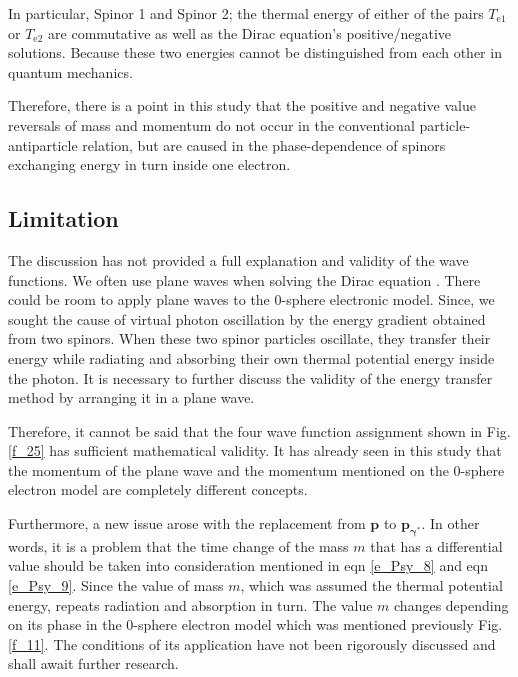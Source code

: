 \documentclass[%
 reprint,
 amsmath,amssymb,
 aps,
]{revtex4-1}
\numberwithin{equation}{section}%
\begin{document}
    In particular, Spinor 1 and Spinor 2; the thermal energy of either of the pairs $T_{\mathrm{e1}}$ or $T_{\mathrm{e2}}$ are commutative as well as the Dirac equation's positive/negative solutions. Because these two energies cannot be distinguished from each other in quantum mechanics.

    Therefore, there is a point in this study that the positive and negative value reversals of mass and momentum do not occur in the conventional particle-antiparticle relation, but are caused in the phase-dependence of spinors exchanging energy in turn inside one electron.


\subsection{
    \label{sec:Limitation}
        Limitation}

    The discussion has not provided a full explanation and validity of the wave functions. We often use plane waves when solving the Dirac equation \cite{J.J.Sakurai}. There could be room to apply plane waves to the 0-sphere electronic model. Since, we sought the cause of virtual photon oscillation by the energy gradient obtained from two spinors. When these two spinor particles oscillate, they transfer their energy while radiating and absorbing their own thermal potential energy inside the photon. It is necessary to further discuss the validity of the energy transfer method by arranging it in a plane wave.
    
    Therefore, it cannot be said that the four wave function assignment shown in Fig. \ref{f_25} has sufficient mathematical validity. It has already seen in this study that the momentum of the plane wave and the momentum mentioned on the 0-sphere electron model are completely different concepts.

    Furthermore, a new issue arose with the replacement from $\bm{p}$ to $\bm{p_{\gamma^{*}}}$. In other words, it is a problem that the time change of the mass $m$ that has a differential value should be taken into consideration mentioned in eqn \ref{e_Psy_8} and eqn \ref{e_Psy_9}. Since the value of mass $m$, which was assumed the thermal potential energy, repeats radiation and absorption in turn. The value $m$ changes depending on its phase in the 0-sphere electron model which was mentioned previously Fig. \ref{f_11}. The conditions of its application have not been rigorously discussed and shall await further research.
\end{document}

